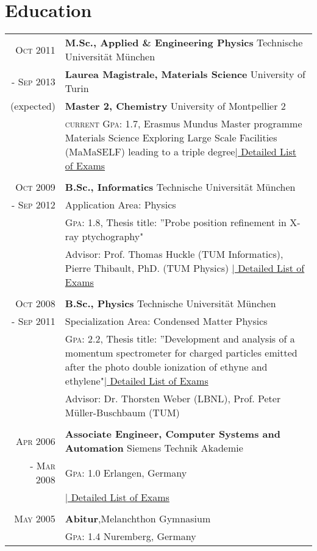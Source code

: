 \documentclass[a4paper,10pt]{article}
\begin{document}
\section{Education}
\begin{tabularx}{19cm}{rX}	

\textsc{Oct 2011}& \textbf{M.Sc., Applied \& Engineering Physics} \hfill{Technische Universität München}\\
\textsc{- Sep 2013} & \textbf{Laurea Magistrale, Materials Science} \hfill{University of Turin}\\
 (expected)&  \textbf{Master 2, Chemistry} \hfill{University of Montpellier 2}\\
 &  \textsc{current Gpa}: 1.7, \small{Erasmus Mundus Master programme Materials Science Exploring Large Scale Facilities (MaMaSELF) leading to a
triple degree}\hyperlink{MSC}{\hfill |\footnotesize{ Detailed List of Exams}}\\\\

\textsc{Oct 2009}& \textbf{B.Sc., Informatics} \hfill{Technische Universität München}\\
\textsc{- Sep 2012} & Application Area: Physics\\
 & \textsc{Gpa}: 1.8, \small{Thesis title: ”Probe position refinement in X-ray ptychography"}\\
& Advisor: Prof. Thomas Huckle (TUM Informatics), Pierre Thibault, PhD. (TUM Physics)
\hyperlink{grds_studies}{\hfill |\footnotesize{ Detailed List of Exams}}
\\\\

\textsc{Oct 2008}& \textbf{B.Sc.,  Physics} \hfill\normalsize{Technische Universität München}\\
 \textsc{- Sep 2011}& Specialization Area: Condensed Matter Physics \\
& \textsc{Gpa}: 2.2, \small{Thesis title: ”Development and analysis of a momentum spectrometer for charged particles emitted after the photo double ionization of ethyne and ethylene"}\hyperlink{physicsBSC}{\hfill |\footnotesize{ Detailed List of Exams}}\\
& Advisor: Dr. Thorsten Weber (LBNL),  Prof. Peter Müller-Buschbaum (TUM) \\\\


\textsc{Apr 2006}& \textbf{Associate Engineer, Computer Systems and Automation} \hfill  {Siemens Technik Akademie}\\
\textsc{- Mar 2008}& \textsc{Gpa}: 1.0  \hfill Erlangen, Germany\\
 &\hyperlink{grds_siemens}{\hfill| \footnotesize Detailed List of Exams}\\ \\

\textsc{May} 2005& \textbf{Abitur},\hfill  Melanchthon Gymnasium \\
&  \textsc{Gpa}: 1.4 \hfill Nuremberg, Germany

\end{tabularx}
\end{document}

